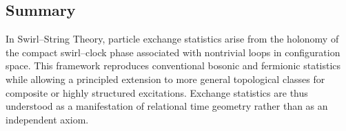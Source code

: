 \documentclass[11pt]{article}
\begin{document}
        \subsection{Summary}

            In Swirl--String Theory, particle exchange statistics arise from the holonomy of
            the compact swirl--clock phase associated with nontrivial loops in configuration
            space.
            This framework reproduces conventional bosonic and fermionic statistics while
            allowing a principled extension to more general topological classes for
            composite or highly structured excitations.
            Exchange statistics are thus understood as a manifestation of relational time
            geometry rather than as an independent axiom.

\end{document}
